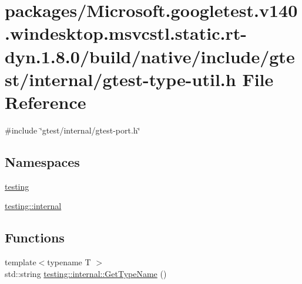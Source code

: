 \hypertarget{gtest-type-util_8h}{}\section{packages/\+Microsoft.googletest.\+v140.\+windesktop.\+msvcstl.\+static.\+rt-\/dyn.1.8.0/build/native/include/gtest/internal/gtest-\/type-\/util.h File Reference}
\label{gtest-type-util_8h}
{\ttfamily \#include \char`\"{}gtest/internal/gtest-\/port.\+h\char`\"{}}\newline
\subsection*{Namespaces}
\begin{DoxyCompactItemize}
\item 
 \mbox{\hyperlink{namespacetesting}{testing}}
\item 
 \mbox{\hyperlink{namespacetesting_1_1internal}{testing\+::internal}}
\end{DoxyCompactItemize}
\subsection*{Functions}
\begin{DoxyCompactItemize}
\item 
{\footnotesize template$<$typename T $>$ }\\std\+::string \mbox{\hyperlink{namespacetesting_1_1internal_a635606b4731f843c86ec8ca51cab83a1}{testing\+::internal\+::\+Get\+Type\+Name}} ()
\end{DoxyCompactItemize}
